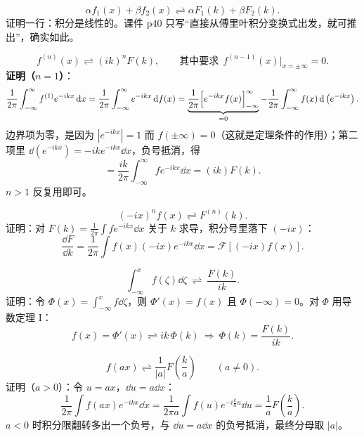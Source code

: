 \documentclass[11pt]{ctexart}
\begin{document}

\[ \alpha f_1(x)+\beta f_2(x)\rightleftharpoons\alpha F_1(k)+\beta F_2(k) .\]
证明一行：积分是线性的。课件 p40 只写“直接从傅里叶积分变换式出发，就可推出”，确实如此。


\[ f^{(n)}(x)\rightleftharpoons(ik)^{n}F(k),\qquad\text{其中要求}\ \ f^{(n-1)}(x)\Big|_{x=\pm\infty}=0 .\]
\textbf{证明（$n=1$）}：
\[
\frac{1}{2\pi}\int_{-\infty}^{\infty}f^{(1)}e^{-ikx}\,\mathrm{d} x
=\frac{1}{2\pi}\int_{-\infty}^{\infty}e^{-ikx}\,\mathrm{d} f(x)
=\underbrace{\frac{1}{2\pi}\Bigl[e^{-ikx}f(x)\Bigr]_{-\infty}^{\infty}}_{=0}
-\frac{1}{2\pi}\int_{-\infty}^{\infty}f(x)\,\mathrm{d}\left(e^{-ikx}\right) .
\]
边界项为零，是因为 $|e^{-ikx}|=1$ 而 $f(\pm\infty)=0$（这就是定理条件的作用）；第二项里 $\dd(e^{-ikx})=-ike^{-ikx}\dd x$，负号抵消，得
\[ =\frac{ik}{2\pi}\int_{-\infty}^{\infty}f e^{-ikx}\dd x=(ik)F(k) .\]
$n>1$ 反复用即可。



\[ (-ix)^{n}f(x)\rightleftharpoons F^{(n)}(k) .\]
证明：对 $F(k)=\frac{1}{2\pi}\int f e^{-ikx}\dd x$ 关于 $k$ 求导，积分号里落下 $(-ix)$：
\[ \frac{\dd F}{\dd k}=\frac{1}{2\pi}\int f(x)(-ix)e^{-ikx}\dd x=\mathcal{F}\left[(-ix)f(x)\right] .\]


\[ \int_{-\infty}^{x}f(\zeta)\dd\zeta\ \rightleftharpoons\ \frac{F(k)}{ik} .\]
证明：令 $\Phi(x)=\int_{-\infty}^{x}f\dd\zeta$，则 $\Phi'(x)=f(x)$ 且 $\Phi(-\infty)=0$。对 $\Phi$ 用导数定理 I：
\[ f(x)=\Phi'(x)\rightleftharpoons ik\,\Phi(k)\ \Longrightarrow\ \Phi(k)=\frac{F(k)}{ik} .\]



\[ f(ax)\rightleftharpoons\frac{1}{|a|}F\!\left(\frac{k}{a}\right)\qquad(a\ne0) .\]
证明（$a>0$）：令 $u=ax$，$\dd u=a\dd x$：
\[
\frac{1}{2\pi}\int f(ax)e^{-ikx}\dd x=\frac{1}{2\pi a}\int f(u)e^{-i\frac{k}{a}u}\dd u=\frac{1}{a}F\!\left(\frac{k}{a}\right) .
\]
$a<0$ 时积分限翻转多出一个负号，与 $\dd u=a\dd x$ 的负号抵消，最终分母取 $|a|$。
\end{document}
